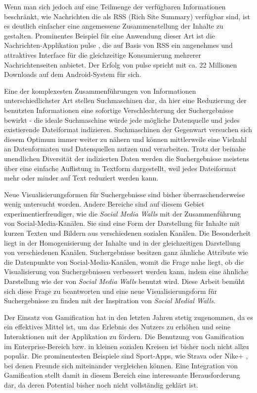 \documentclass[12pt,twoside]{book}
\begin{document}
Wenn man sich jedoch auf eine Teilmenge der verfügbaren Informationen beschränkt, wie Nachrichten die als RSS (Rich Site Summary) verfügbar sind, ist es deutlich einfacher eine angemessene Zusammenstellung der Inhalte zu gestalten. Prominentes Beispiel für eine Anwendung dieser Art ist die Nachrichten-Applikation pulse \cite{pulse}, die auf Basis von RSS ein angenehmes und attraktives Interface für die gleichzeitige Konsumierung mehrerer Nachrichtenseiten anbietet. Der Erfolg von pulse spricht mit ca. 22 Millionen Downloads auf dem Android-System für sich.

Eine der komplexesten Zusammenführungen von Informationen unterschiedlichster Art stellen Suchmaschinen dar, da hier eine Reduzierung der benutzten Informationen eine sofortige Verschlechterung der Suchergebnisse bewirkt - die ideale Suchmaschine würde jede mögliche Datenquelle und jedes existierende Dateiformat indizieren.
Suchmaschinen der Gegenwart versuchen sich diesem Optimum immer weiter zu nähern und können mittlerweile eine Vielzahl an Datenformaten und Datenquellen nutzen und verarbeiten.
Trotz der beinahe unendlichen Diversität der indizierten Daten werden die Suchergebnisse meistens über eine einfache Auflistung in Textform dargestellt, weil jedes Dateiformat mehr oder minder auf Text reduziert werden kann.

Neue Visualisierungsformen für Suchergebnisse sind bisher überraschenderweise wenig untersucht worden. Andere Bereiche sind auf diesem Gebiet experimentierfreudiger, wie die \textit{Social Media Walls} mit der Zusammenführung von Social-Media-Kanälen.
Sie sind eine Form der Darstellung für Inhalte mit kurzen Texten und Bildern aus verschiedenen sozialen Kanälen. Die Besonderheit liegt in der Homogenisierung der Inhalte und in der gleichzeitigen Darstellung von verschiedenen Kanälen.
Suchergebnisse besitzen ganz ähnliche Attribute wie die Datenpunkte von Social-Media-Kanälen, womit die Frage nahe liegt, ob die Visualisierung von Suchergebnissen verbessert werden kann, indem eine ähnliche Darstellung wie der von \textit{Social Media Walls} benutzt wird.
Diese Arbeit bemüht sich diese Frage zu beantworten und eine neue Visualisierungsform für Suchergebnisse zu finden mit der Inspiration von \textit{Social Medial Walls}.

Der Einsatz von Gamification hat in den letzten Jahren stetig zugenommen, da es ein effektives Mittel ist, um das Erlebnis des Nutzers zu erhöhen und seine Interaktionen mit der Applikation zu fördern.
Die Benutzung von Gamification im Enterprise-Bereich bzw. in kleinen sozialen Kreisen ist bisher noch nicht allzu populär. Die prominentesten Beispiele sind Sport-Apps, wie Strava \cite{strava} oder Nike+ \cite{nike}, bei denen Freunde sich miteinander vergleichen können. Eine Integration von Gamification stellt damit in diesem Bereich eine interessante Herausforderung dar, da deren Potential bisher noch nicht vollständig geklärt ist.
\end{document}
